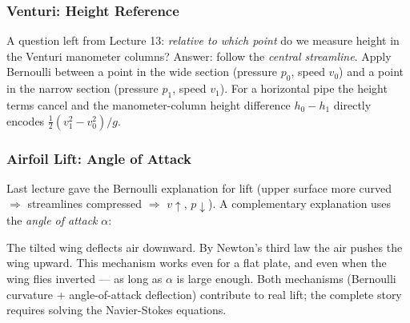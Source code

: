 \documentclass[../main.tex]{subfiles}
\begin{document}
\subsubsection*{Venturi: Height Reference}
A question left from Lecture 13: \emph{relative to which point} do we measure height in the Venturi manometer columns? Answer: follow the \emph{central streamline}. Apply Bernoulli between a point in the wide section (pressure $p_0$, speed $v_0$) and a point in the narrow section (pressure $p_1$, speed $v_1$). For a horizontal pipe the height terms cancel and the manometer-column height difference $h_0-h_1$ directly encodes $\frac{1}{2}(v_1^2-v_0^2)/g$.

\subsubsection*{Airfoil Lift: Angle of Attack}
Last lecture gave the Bernoulli explanation for lift (upper surface more curved $\Rightarrow$ streamlines compressed $\Rightarrow$ $v\uparrow$, $p\downarrow$). A complementary explanation uses the \emph{angle of attack} $\alpha$:

\begin{center}
\end{center}

The tilted wing deflects air downward. By Newton's third law the air pushes the wing upward. This mechanism works even for a flat plate, and even when the wing flies inverted — as long as $\alpha$ is large enough. Both mechanisms (Bernoulli curvature + angle-of-attack deflection) contribute to real lift; the complete story requires solving the Navier-Stokes equations.
\end{document}
